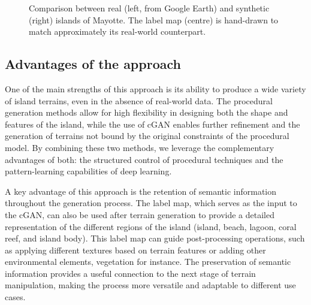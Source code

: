 \begin{figure}
\caption{Comparison between real (left, from Google Earth) and synthetic (right) islands of Mayotte. The label map (centre) is hand-drawn to match approximately its real-world counterpart.}
\label{fig:coral-island-example-Mayotte}
\end{figure}








\subsection{Advantages of the approach}
\label{sec:coral-island-advantages}

One of the main strengths of this approach is its ability to produce a wide variety of island terrains, even in the absence of real-world data. The procedural generation methods allow for high flexibility in designing both the shape and features of the island, while the use of cGAN enables further refinement and the generation of terrains not bound by the original constraints of the procedural model. By combining these two methods, we leverage the complementary advantages of both: the structured control of procedural techniques and the pattern-learning capabilities of deep learning.

A key advantage of this approach is the retention of semantic information throughout the generation process. The label map, which serves as the input to the cGAN, can also be used after terrain generation to provide a detailed representation of the different regions of the island (island, beach, lagoon, coral reef, and island body). This label map can guide post-processing operations, such as applying different textures based on terrain features or adding other environmental elements, vegetation for instance. The preservation of semantic information provides a useful connection to the next stage of terrain manipulation, making the process more versatile and adaptable to different use cases.

